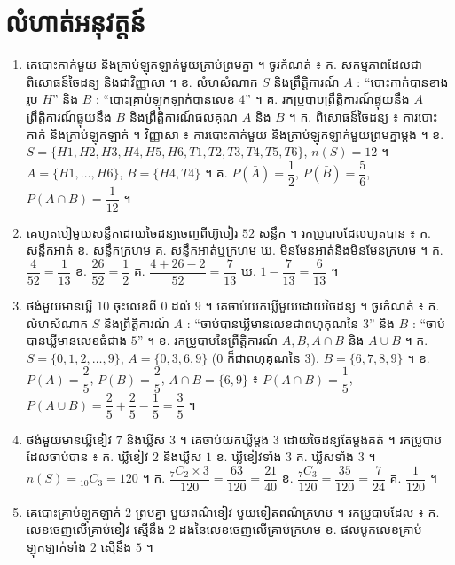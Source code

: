 \section*{លំហាត់អនុវត្តន៍}
\begin{enumerate}[1]
  \item គេបោះកាក់មួយ និងគ្រាប់ឡុកឡាក់មួយគ្រាប់ព្រមគ្នា ។ ចូរកំណត់ ៖ \quad ក. សកម្មភាពដែលជាពិសោធន៍ចៃដន្យ និងជាវិញ្ញាសា ។ \quad ខ. លំហសំណាក $S$ និងព្រឹត្តិការណ៍ $A$ : “បោះកាក់បានខាងរូប $H$” និង $B$ : “បោះគ្រាប់ឡុកឡាក់បានលេខ $4$” ។ \quad គ. រកប្រូបាបព្រឹត្តិការណ៍ផ្ទុយនឹង $A$ ព្រឹត្តិការណ៍ផ្ទុយនឹង $B$ និងព្រឹត្តិការណ៍ផលគុណ $A$ និង $B$ ។
  \ans
  ក. ពិសោធន៍ចៃដន្យ ៖ ការបោះកាក់ និងគ្រាប់ឡុកឡាក់ ។ វិញ្ញាសា ៖ ការបោះកាក់មួយ និងគ្រាប់ឡុកឡាក់មួយព្រមគ្នាម្ដង ។ \quad ខ. $S = \{H1, H2, H3, H4, H5, H6, T1, T2, T3, T4, T5, T6\}$, $n(S) = 12$ ។ $A = \{H1, \dots, H6\}$, $B = \{H4, T4\}$ ។ \quad គ. $P(\bar{A}) = \dfrac{1}{2}$, $P(\bar{B}) = \dfrac{5}{6}$, $P(A \cap B) = \dfrac{1}{12}$ ។
  \item គេហូតបៀមួយសន្លឹកដោយចៃដន្យចេញពីហ៊ូបៀរ $52$ សន្លឹក ។ រកប្រូបាបដែលហូតបាន ៖ \quad ក. សន្លឹកអាត់ \quad ខ. សន្លឹកក្រហម \quad គ. សន្លឹកអាត់ឬក្រហម \quad ឃ. មិនមែនអាត់និងមិនមែនក្រហម ។
  \ans
  ក. $\dfrac{4}{52} = \dfrac{1}{13}$ \quad ខ. $\dfrac{26}{52} = \dfrac{1}{2}$ \quad គ. $\dfrac{4 + 26 - 2}{52} = \dfrac{7}{13}$ \quad ឃ. $1 - \dfrac{7}{13} = \dfrac{6}{13}$ ។
  \item ថង់មួយមានឃ្លី $10$ ចុះលេខពី $0$ ដល់ $9$ ។ គេចាប់យកឃ្លីមួយដោយចៃដន្យ ។ ចូរកំណត់ ៖ \quad ក. លំហសំណាក $S$ និងព្រឹត្តិការណ៍ $A$ : “ចាប់បានឃ្លីមានលេខជាពហុគុណនៃ $3$” និង $B$ : “ចាប់បានឃ្លីមានលេខធំជាង $5$” ។ \quad ខ. រកប្រូបាបនៃព្រឹត្តិការណ៍ $A, B, A \cap B$ និង $A \cup B$ ។
  \ans
  ក. $S = \{0, 1, 2, \dots, 9\}$, $A = \{0, 3, 6, 9\}$ ($0$ ក៏ជាពហុគុណនៃ $3$), $B = \{6, 7, 8, 9\}$ ។ \quad ខ. $P(A) = \dfrac{2}{5}$, $P(B) = \dfrac{2}{5}$, $A \cap B = \{6, 9\}$ ៖ $P(A \cap B) = \dfrac{1}{5}$, $P(A \cup B) = \dfrac{2}{5} + \dfrac{2}{5} - \dfrac{1}{5} = \dfrac{3}{5}$ ។
  \item ថង់មួយមានឃ្លីខៀវ $7$ និងឃ្លីស $3$ ។ គេចាប់យកឃ្លីម្ដង $3$ ដោយចៃដន្យតែម្ដងគត់ ។ រកប្រូបាបដែលចាប់បាន ៖ \quad ក. ឃ្លីខៀវ $2$ និងឃ្លីស $1$ \quad ខ. ឃ្លីខៀវទាំង $3$ \quad គ. ឃ្លីសទាំង $3$ ។
  \ans
  $n(S) = {}_{10}C_3 = 120$ ។ ក. $\dfrac{{}_7C_2\times 3}{120} = \dfrac{63}{120} = \dfrac{21}{40}$ \quad ខ. $\dfrac{{}_7C_3}{120} = \dfrac{35}{120} = \dfrac{7}{24}$ \quad គ. $\dfrac{1}{120}$ ។
  \item គេបោះគ្រាប់ឡុកឡាក់ $2$ ព្រមគ្នា មួយពណ៌ខៀវ មួយទៀតពណ៌ក្រហម ។ រកប្រូបាបដែល ៖ \quad ក. លេខចេញលើគ្រាប់ខៀវ ស្មើនឹង $2$ ដងនៃលេខចេញលើគ្រាប់ក្រហម \quad ខ. ផលបូកលេខគ្រាប់ឡុកឡាក់ទាំង $2$ ស្មើនឹង $5$ ។

\end{enumerate}
